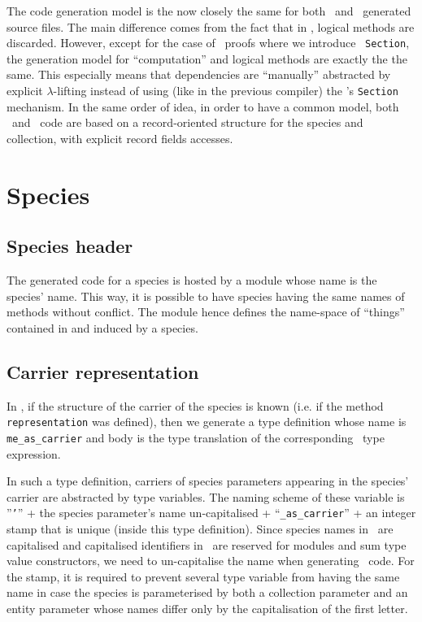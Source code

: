 \label{code-gen-model}
The code generation model is the now closely the same for both \ocaml\
and \coq\ generated source files. The main difference comes from the
fact that in \ocaml, logical methods are discarded. However, except
for the case of \zenon\ proofs where we introduce \coq\ {\tt Section},
the generation model for ``computation'' and logical methods are
exactly the the same. This especially means that dependencies are
``manually'' abstracted by explicit $\lambda$-lifting instead of using
(like in the previous compiler) the \coq's {\tt Section}
mechanism. In the same order of idea, in order to have a common model,
both \ocaml\ and \coq\ code are based on a record-oriented structure
for the species and collection, with explicit record fields accesses.

\section{Species}
\subsection{Species header}
The generated code for a species is hosted by a module whose name is
the species' name. This way, it is possible to have species having the
same names of methods without conflict. The module hence defines the
name-space of ``things'' contained in and induced by a species.


\subsection{Carrier representation}
In \ocaml, if the structure of the carrier of the species is known
(i.e. if the method {\tt representation} was defined), then we
generate a type definition whose name is {\tt me\_as\_carrier} and
body is the type translation of the corresponding \focalize\ type
expression.

In such a type definition, carriers of species parameters appearing in
the species' carrier are abstracted by type variables. The naming
scheme of these variable is ''{\tt '}'' + the species parameter's name
un-capitalised + ``{\tt \_as\_carrier}'' + an integer stamp that is
unique (inside this type definition). Since species names in
\focalize\ are capitalised and capitalised identifiers in \ocaml\ are
reserved for modules and sum type value constructors, we need to
un-capitalise the name when generating \ocaml\ code. For the stamp, it
is required to prevent several type variable from having the same name
in case the species is parameterised by both a collection parameter
and an entity parameter whose names differ only by the capitalisation
of the first letter.

